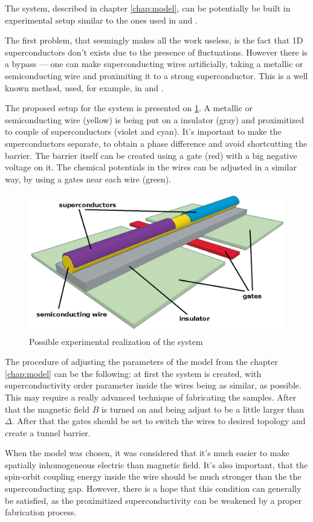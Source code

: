 The system, described in chapter \ref{chap:model}, can be potentially be built in experimental setup similar to the ones used in \cite{majorana_experiment_Kouwenhoven} and \cite{majorana_experiment_Zhang}. 

The first problem, that seemingly makes all the work useless, is the fact that 1D superconductors don't exists due to the presence of fluctuations. However there is a bypass --- one can make superconducting wires artificially, taking a metallic or semiconducting wire and proximiting it to a strong superconductor. This is a well known method, used, for example, in \cite{majorana_experiment_Kouwenhoven} and \cite{majorana_experiment_Zhang}. 

The proposed  setup for the system is presented on \ref{fig:realmodel3}.  A metallic or semiconducting wire (yellow) is being put on a insulator (gray) and proximitized to couple of superconductors (violet and cyan). It's important to make the superconductors separate, to obtain a phase difference and avoid shortcutting the barrier. The barrier itself can be created using a gate (red) with a big negative voltage on it.
The chemical potentials in the wires can be adjusted in a similar way, by using a gates near each wire (green).
\begin{figure}[H]
	\centering
	\includegraphics[width=0.7\linewidth]{images/real_model_3}
	\caption{Possible experimental realization of the system}
	\label{fig:realmodel3}
\end{figure}
The procedure of adjusting the parameters of the model from the chapter \ref{chap:model} can be the following: at first the system is created, with superconductivity order parameter inside the wires being as similar, as possible. This may require a really advanced technique of fabricating the samples. After that the magnetic field $ B $ is turned on and being adjust to be a little larger than $ \Delta $. After that the gates should be set to switch the wires to desired topology and create a tunnel barrier.

When the model was chosen, it was considered that it's much easier to make spatially inhomogeneous electric than magnetic field. It's also important, that the spin-orbit coupling energy inside the wire should be much stronger than the the superconducting gap. However, there is a hope that this condition can generally be satisfied, as the proximitized superconductivity can be weakened	 by a proper fabrication process.